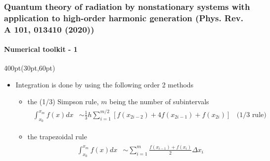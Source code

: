 \begin{frame}
\frametitle{Quantum theory of radiation by nonstationary systems 
	with application to high-order harmonic generation
        (Phys. Rev. A 101, 013410 (2020))}
	\framesubtitle{Numerical toolkit - 1}
\small

\begin{textblock*}{400pt}(30pt,60pt)
\footnotesize
\begin{itemize}
\item Integration is done by using the following order 2 methods
\begin{itemize}
\item[$\bullet$] the (1/3) Simpson rule,
$m$ being the number of subintervals
\begin{align}
\begin{split}
 \int_{x_0}^{x_m} f(x)dx & \sim \frac{1}{3} h \sum_{i=1}^{m/2}
  \left[ f(x_{2i-2})  + 4f(x_{2i-1}) + f(x_{2i})\right]\;\;\mbox{ (1/3 rule) }
\end{split} \label{eqn:simps18} 
\end{align}

\item[$\bullet$] the trapezoidal rule
\begin{align}
\begin{split}
 \int_{x_0}^{x_m} f(x)dx 
   & \sim \sum_{i=1}^{m} \frac{ f(x_{i-1})  + f(x_{i})}{2}\Delta x_i
\end{split} \label{eqn:trapez} 
\end{align}
\end{itemize}

%

\end{itemize}

\end{textblock*}


\end{frame}



